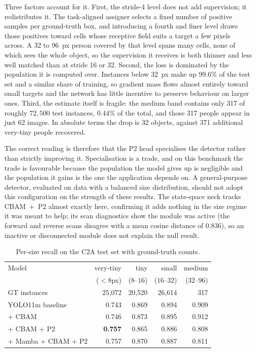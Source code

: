 Three factors account for it. First, the stride-4 level does not add supervision;
it redistributes it. The task-aligned assigner selects a fixed number of positive
samples per ground-truth box, and introducing a fourth and finer level draws
those positives toward cells whose receptive field suits a target a few pixels
across. A 32 to 96~px person covered by that level spans many cells, none of
which sees the whole object, so the supervision it receives is both thinner and
less well matched than at stride 16 or 32. Second, the loss is dominated by the
population it is computed over. Instances below 32~px make up $99.6\%$ of the
test set and a similar share of training, so gradient mass flows almost entirely
toward small targets and the network has little incentive to preserve behaviour
on larger ones. Third, the estimate itself is fragile: the medium band contains
only 317 of roughly $72{,}500$ test instances, $0.44\%$ of the total, and those
317 people appear in just 62 images. In absolute terms the drop is 32 objects,
against 371 additional very-tiny people recovered.

The correct reading is therefore that the P2 head specialises the detector
rather than strictly improving it. Specialisation is a trade, and on this
benchmark the trade is favourable because the population the model gives up is
negligible and the population it gains is the one the application depends on. A
general-purpose detector, evaluated on data with a balanced size distribution,
should not adopt this configuration on the strength of these results. The state-space neck tracks CBAM~+~P2 almost exactly
here, confirming it adds nothing in the size regime it was meant to help; its
scan diagnostics show the module was active (the forward and reverse scans
disagree with a mean cosine distance of $0.836$), so an inactive or disconnected
module does not explain the null result.

\begin{table}[tbp]
  \centering
  \caption{Per-size recall on the C2A test set with ground-truth counts.}
  \label{tab:persize}
  \begin{tabular}{@{}l r r r r@{}}
    \toprule
    Model & very-tiny & tiny & small & medium \\
    & ($<8$px) & ($8$--$16$) & ($16$--$32$) & ($32$--$96$) \\
    GT instances & 25{,}072 & 20{,}520 & 26{,}614 & 317 \\
    \midrule
    YOLO11m baseline    & 0.743 & 0.869 & 0.894 & 0.909 \\
    + CBAM              & 0.746 & 0.873 & 0.895 & 0.912 \\
    + CBAM + P2         & \textbf{0.757} & 0.865 & 0.886 & 0.808 \\
    + Mamba + CBAM + P2 & 0.757 & 0.870 & 0.887 & 0.811 \\
    \bottomrule
  \end{tabular}
\end{table}


